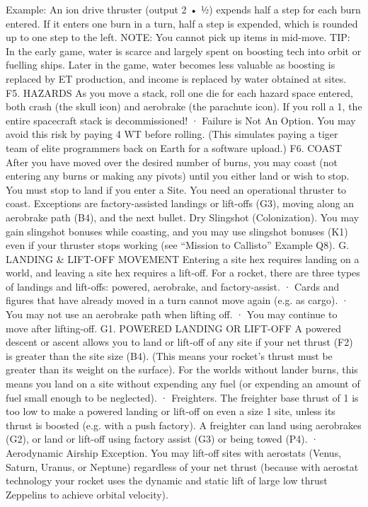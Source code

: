 \documentclass[a4paper]{book}
\begin{document}
Example: An ion drive thruster (output 2 • ½) expends half a step for each burn entered. If it enters one burn in a turn, half a step is expended, which is rounded up to one step to the left.
NOTE: You cannot pick up items in mid-move.
TIP: In the early game, water is scarce and largely spent on boosting tech into orbit or fuelling ships. Later in the game, water becomes less valuable as boosting is replaced by ET production, and income is replaced by water obtained at sites.
F5. HAZARDS
As you move a stack, roll one die for each hazard space entered, both crash (the skull icon) and aerobrake (the parachute icon). If you roll a 1, the entire spacecraft stack is decommissioned!
·   	Failure is Not An Option. You may avoid this risk by paying 4 WT before rolling. (This simulates paying a tiger team of elite programmers back on Earth for a software upload.)
F6. COAST
After you have moved over the desired number of burns, you may coast (not entering any burns or making any pivots) until you either land or wish to stop.
You must stop to land if you enter a Site.
You need an operational thruster to coast. Exceptions are factory-assisted landings or lift-offs (G3), moving along an aerobrake path (B4), and the next bullet.
Dry Slingshot (Colonization). You may gain slingshot bonuses while coasting, and you may use slingshot bonuses (K1) even if your thruster stops working (see “Mission to Callisto” Example Q8).
G. LANDING \& LIFT-OFF MOVEMENT
Entering a site hex requires landing on a world, and leaving a site hex requires a lift-off. For a rocket, there are three types of landings and lift-offs: powered, aerobrake, and factory-assist.
·       Cards and figures that have already moved in a turn cannot move again (e.g. as cargo).
·       You may not use an aerobrake path when lifting off.
·       You may continue to move after lifting-off.
G1. POWERED LANDING OR LIFT-OFF
A powered descent or ascent allows you to land or lift-off of any site if your net thrust (F2) is greater than the site size (B4). (This means your rocket’s thrust must be greater than its weight on the surface). For the worlds without lander burns, this means you land on a site without expending any fuel (or expending an amount of fuel small enough to be neglected).
·       Freighters. The freighter base thrust of 1 is too low to make a powered landing or lift-off on even a size 1 site, unless its thrust is boosted (e.g. with a push factory). A freighter can land using aerobrakes (G2), or land or lift-off using factory assist (G3) or being towed (P4).
·       Aerodynamic Airship Exception. You may lift-off sites with aerostats (Venus, Saturn, Uranus, or Neptune) regardless of your net thrust (because with aerostat technology your rocket uses the dynamic and static lift of large low thrust Zeppelins to achieve orbital velocity).
\end{document}
